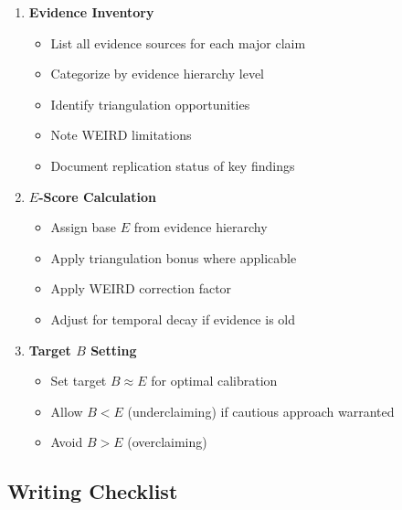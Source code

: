 \documentclass[11pt,a4paper]{article}
\begin{document}
\begin{enumerate}
    \item \textbf{Evidence Inventory}
    \begin{itemize}
        \item[$\square$] List all evidence sources for each major claim
        \item[$\square$] Categorize by evidence hierarchy level
        \item[$\square$] Identify triangulation opportunities
        \item[$\square$] Note WEIRD limitations
        \item[$\square$] Document replication status of key findings
    \end{itemize}

    \item \textbf{$E$-Score Calculation}
    \begin{itemize}
        \item[$\square$] Assign base $E$ from evidence hierarchy
        \item[$\square$] Apply triangulation bonus where applicable
        \item[$\square$] Apply WEIRD correction factor
        \item[$\square$] Adjust for temporal decay if evidence is old
    \end{itemize}

    \item \textbf{Target $B$ Setting}
    \begin{itemize}
        \item[$\square$] Set target $B \approx E$ for optimal calibration
        \item[$\square$] Allow $B < E$ (underclaiming) if cautious approach warranted
        \item[$\square$] Avoid $B > E$ (overclaiming)
    \end{itemize}
\end{enumerate}

\subsection{Writing Checklist}
\end{document}

